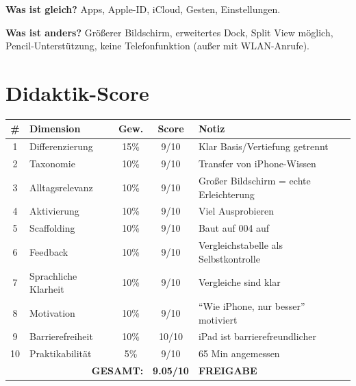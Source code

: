 \documentclass[11pt,a4paper]{article}
\begin{document}
\textbf{Was ist gleich?} Apps, Apple-ID, iCloud, Gesten, Einstellungen.

\textbf{Was ist anders?} Größerer Bildschirm, erweitertes Dock, Split View möglich, Pencil-Unterstützung, keine Telefonfunktion (außer mit WLAN-Anrufe).

\section{Didaktik-Score}

\begin{scorebox}
\begin{tabular}{|c|l|c|c|p{3.5cm}|}
\hline
\# & Dimension & Gew. & Score & Notiz \\
\hline
1 & Differenzierung & 15\% & 9/10 & Klar Basis/Vertiefung getrennt \\
2 & Taxonomie & 10\% & 9/10 & Transfer von iPhone-Wissen \\
3 & Alltagsrelevanz & 10\% & 9/10 & Großer Bildschirm = echte Erleichterung \\
4 & Aktivierung & 10\% & 9/10 & Viel Ausprobieren \\
5 & Scaffolding & 10\% & 9/10 & Baut auf 004 auf \\
6 & Feedback & 10\% & 9/10 & Vergleichstabelle als Selbstkontrolle \\
7 & Sprachliche Klarheit & 10\% & 9/10 & Vergleiche sind klar \\
8 & Motivation & 10\% & 9/10 & ``Wie iPhone, nur besser'' motiviert \\
9 & Barrierefreiheit & 10\% & 10/10 & iPad ist barrierefreundlicher \\
10 & Praktikabilität & 5\% & 9/10 & 65 Min angemessen \\
\hline
\multicolumn{3}{|r|}{\textbf{GESAMT:}} & \textbf{9.05/10} & \textcolor{successgreen}{\textbf{FREIGABE}} \\
\hline
\end{tabular}
\end{scorebox}
\end{document}
